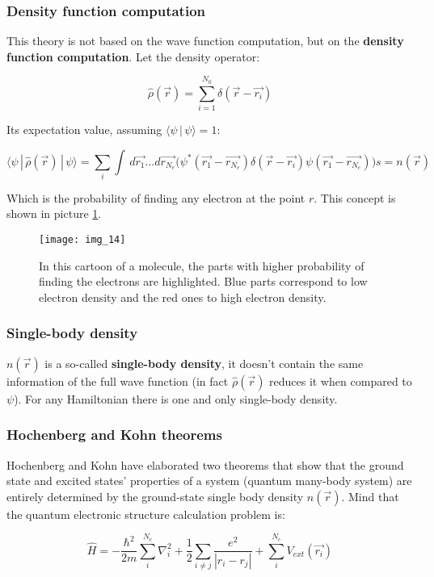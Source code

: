 		\subsubsection{Density function computation}
		This theory is not based on the wave function computation, but on the \textbf{density function computation}.
		Let the density operator:

		$$\hat{\rho}(\vec{r})=\sum_{i=1}^{N_0}\delta(\vec{r}-\vec{r_i})$$

		Its expectation value, assuming $\langle \psi\,|\,\psi \rangle =1$:

		$$\langle \psi\,|\,\hat{\rho}(\vec{r})\,|\,\psi \rangle=\sum_i \int\,d\vec{r_1}...d\vec{r_{N_e}}\bigg(\psi^*(\vec{r_1}-\vec{r_{N_e}})\delta(\vec{r}-\vec{r_i})\psi(\vec{r_1}-\vec{r_{N_e}})\bigg)s=n(\vec{r})$$

		Which is the probability of finding any electron at the point $r$.
		This concept is shown in picture \ref{molecule}.

		\begin{figure}[htbp!]
			\centering
			\texttt{[image: img\_14]}
			\caption{In this cartoon of a molecule, the parts with higher probability of finding the electrons are highlighted. Blue parts correspond to low electron density and the red ones to high electron density.}
			\label{molecule}
		\end{figure}

		\subsubsection{Single-body density}
		$n(\vec{r})$ is a so-called \textbf{single-body density}, it doesn't contain the same information of the full wave function (in fact $\hat{\rho}(\vec{r})$ reduces it when compared to $\psi$).
		For any Hamiltonian there is one and only single-body density.\\

		\subsubsection{Hochenberg and Kohn theorems}
		Hochenberg and Kohn have elaborated two theorems that show that the ground state and excited states' properties of a system (quantum many-body system) are entirely determined by the ground-state single body density $n(\vec{r})$.
		Mind that the quantum electronic structure calculation problem is:

		$$\hat{H}=-\frac{\hbar^2}{2m}\sum_i^{N_e}\nabla_i^2+\frac{1}{2}\sum_{i\neq j} \frac{e^2}{|r_i-r_j|}+\sum_i^{N_e}V_{ext}(\vec{r_i})$$


